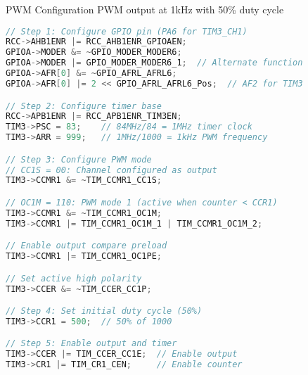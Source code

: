 \begin{example2}{PWM Configuration} PWM output at 1kHz with 50\% duty cycle

\begin{lstlisting}[language=C, style=basesmol]
// Step 1: Configure GPIO pin (PA6 for TIM3_CH1)
RCC->AHB1ENR |= RCC_AHB1ENR_GPIOAEN;
GPIOA->MODER &= ~GPIO_MODER_MODER6;
GPIOA->MODER |= GPIO_MODER_MODER6_1;  // Alternate function
GPIOA->AFR[0] &= ~GPIO_AFRL_AFRL6;
GPIOA->AFR[0] |= 2 << GPIO_AFRL_AFRL6_Pos;  // AF2 for TIM3

// Step 2: Configure timer base
RCC->APB1ENR |= RCC_APB1ENR_TIM3EN;
TIM3->PSC = 83;    // 84MHz/84 = 1MHz timer clock
TIM3->ARR = 999;   // 1MHz/1000 = 1kHz PWM frequency

// Step 3: Configure PWM mode
// CC1S = 00: Channel configured as output
TIM3->CCMR1 &= ~TIM_CCMR1_CC1S;

// OC1M = 110: PWM mode 1 (active when counter < CCR1)
TIM3->CCMR1 &= ~TIM_CCMR1_OC1M;
TIM3->CCMR1 |= TIM_CCMR1_OC1M_1 | TIM_CCMR1_OC1M_2;

// Enable output compare preload
TIM3->CCMR1 |= TIM_CCMR1_OC1PE;

// Set active high polarity
TIM3->CCER &= ~TIM_CCER_CC1P;

// Step 4: Set initial duty cycle (50%)
TIM3->CCR1 = 500;  // 50% of 1000

// Step 5: Enable output and timer
TIM3->CCER |= TIM_CCER_CC1E;  // Enable output
TIM3->CR1 |= TIM_CR1_CEN;     // Enable counter
\end{lstlisting}
\end{example2}




